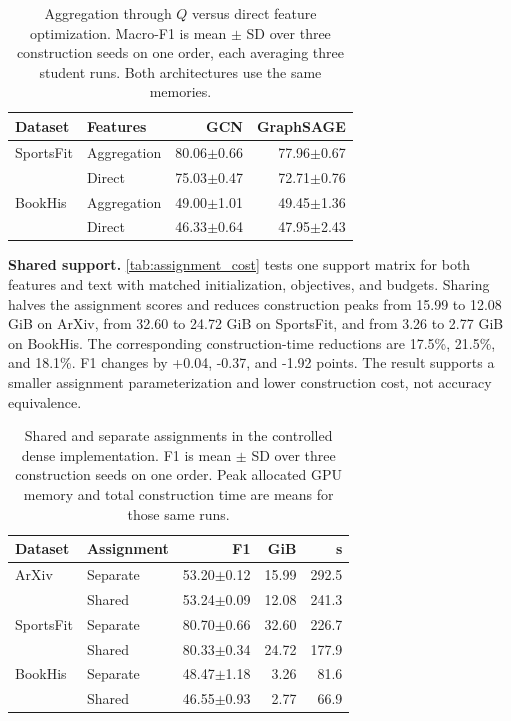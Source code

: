 \begin{table}[t]
\centering
\footnotesize
\setlength{\tabcolsep}{3pt}
\caption{Aggregation through $Q$ versus direct feature optimization. Macro-F1 is mean $\pm$ SD over three construction seeds on one order, each averaging three student runs. Both architectures use the same memories.}
\label{tab:direct_features}
\begin{tabular*}{\columnwidth}{@{\extracolsep{\fill}}llrr@{}}
\toprule
Dataset & Features & GCN & GraphSAGE\\
\midrule
SportsFit & Aggregation & 80.06$\pm$0.66 & 77.96$\pm$0.67\\
& Direct & 75.03$\pm$0.47 & 72.71$\pm$0.76\\
BookHis & Aggregation & 49.00$\pm$1.01 & 49.45$\pm$1.36\\
& Direct & 46.33$\pm$0.64 & 47.95$\pm$2.43\\
\bottomrule
\end{tabular*}
\end{table}

\noindent\textbf{Shared support.}
\autoref{tab:assignment_cost} tests one support matrix for both features and text with matched initialization, objectives, and budgets. Sharing halves the assignment scores and reduces construction peaks from 15.99 to 12.08 GiB on ArXiv, from 32.60 to 24.72 GiB on SportsFit, and from 3.26 to 2.77 GiB on BookHis. The corresponding construction-time reductions are 17.5\%, 21.5\%, and 18.1\%. F1 changes by +0.04, -0.37, and -1.92 points. The result supports a smaller assignment parameterization and lower construction cost, not accuracy equivalence.

\begin{table}[t]
\centering
\footnotesize
\setlength{\tabcolsep}{3pt}
\caption{Shared and separate assignments in the controlled dense implementation. F1 is mean $\pm$ SD over three construction seeds on one order. Peak allocated GPU memory and total construction time are means for those same runs.}
\label{tab:assignment_cost}
\begin{tabular*}{\columnwidth}{@{\extracolsep{\fill}}llrrr@{}}
\toprule
Dataset & Assignment & F1 & GiB & s\\
\midrule
ArXiv & Separate & 53.20$\pm$0.12 & 15.99 & 292.5\\
& Shared & 53.24$\pm$0.09 & 12.08 & 241.3\\
SportsFit & Separate & 80.70$\pm$0.66 & 32.60 & 226.7\\
& Shared & 80.33$\pm$0.34 & 24.72 & 177.9\\
BookHis & Separate & 48.47$\pm$1.18 & 3.26 & 81.6\\
& Shared & 46.55$\pm$0.93 & 2.77 & 66.9\\
\bottomrule
\end{tabular*}
\end{table}

